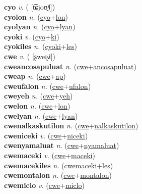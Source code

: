 \textbf{cyo} \textit{v.} ( [t͡ɕjoʊ̯˥˩])
 \label{cyo} \\
\textbf{cyolon} \textit{n.} (\hyperref[cyo]{cyo}+\hyperref[lon]{lon})
 \label{cyolon} \\
\textbf{cyolyan} \textit{n.} (\hyperref[cyo]{cyo}+\hyperref[lyan]{lyan})
 \label{cyolyan} \\
\textbf{cyoki} \textit{v.} (\hyperref[cyo]{cyo}+\hyperref[ki]{ki})
 \label{cyoki} \\
\textbf{cyokiles} \textit{n.} (\hyperref[cyoki]{cyoki}+\hyperref[les]{les})
 \label{cyokiles} \\
\textbf{cwe} \textit{v.} ( [ʂweɪ̯˧˩˧])
 \label{cwe} \\
\textbf{cweancosapuluat} \textit{n.} (\hyperref[cwe]{cwe}+\hyperref[ancosapuluat]{ancosapuluat})
 \label{cweancosapuluat} \\
\textbf{cweap} \textit{n.} (\hyperref[cwe]{cwe}+\hyperref[ap]{ap})
 \label{cweap} \\
\textbf{cweufalon} \textit{n.} (\hyperref[cwe]{cwe}+\hyperref[ufalon]{ufalon})
 \label{cweufalon} \\
\textbf{cweyeh} \textit{n.} (\hyperref[cwe]{cwe}+\hyperref[yeh]{yeh})
 \label{cweyeh} \\
\textbf{cwelon} \textit{n.} (\hyperref[cwe]{cwe}+\hyperref[lon]{lon})
 \label{cwelon} \\
\textbf{cwelyan} \textit{n.} (\hyperref[cwe]{cwe}+\hyperref[lyan]{lyan})
 \label{cwelyan} \\
\textbf{cwenalkaskutilon} \textit{n.} (\hyperref[cwe]{cwe}+\hyperref[nalkaskutilon]{nalkaskutilon})
 \label{cwenalkaskutilon} \\
\textbf{cweniceki} \textit{v.} (\hyperref[cwe]{cwe}+\hyperref[niceki]{niceki})
 \label{cweniceki} \\
\textbf{cwenyamaluat} \textit{n.} (\hyperref[cwe]{cwe}+\hyperref[nyamaluat]{nyamaluat})
 \label{cwenyamaluat} \\
\textbf{cwemaceki} \textit{v.} (\hyperref[cwe]{cwe}+\hyperref[maceki]{maceki})
 \label{cwemaceki} \\
\textbf{cwemacekiles} \textit{n.} (\hyperref[cwemaceki]{cwemaceki}+\hyperref[les]{les})
 \label{cwemacekiles} \\
\textbf{cwemontalon} \textit{n.} (\hyperref[cwe]{cwe}+\hyperref[montalon]{montalon})
 \label{cwemontalon} \\
\textbf{cwemiclo} \textit{v.} (\hyperref[cwe]{cwe}+\hyperref[miclo]{miclo})
 \label{cwemiclo} \\
